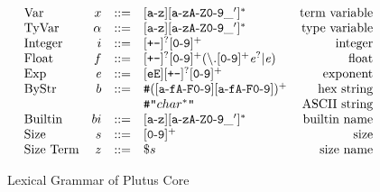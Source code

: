 \documentclass[../main.tex]{subfiles}
\begin{document}
\begin{figure*}[t]
    \centering
    \[\begin{array}{lrclr}
        \textrm{Var}     & x  & ::= & [\mathtt{a}\!\hyphen{}\!\mathtt{z}][\mathtt{a}\!\hyphen{}\!\mathtt{zA}\!\hyphen{}\!\mathtt{Z0}\!\hyphen{}\!\mathtt{9\_'}]^*                                                           & \textrm{term variable}\\
        \textrm{TyVar}   & \alpha & ::= & [\mathtt{a}\!\hyphen{}\!\mathtt{z}][\mathtt{a}\!\hyphen{}\!\mathtt{z A}\!\hyphen{}\!\mathtt{Z0}\!\hyphen{}\!\mathtt{9\_'}]^*                                                      & \textrm{type variable}\\
        \textrm{Integer} & i  & ::= & [\texttt{+-}]^?[\mathtt{0}\!\hyphen{}\!\mathtt{9}]^+                                                                                                                                  & \textrm{integer}\\
        \textrm{Float}   & f  & ::= & [\texttt{+-}]^?[\mathtt{0}\!\hyphen{}\!\mathtt{9}]^+(\mathtt{\backslash{}.}[\mathtt{0}\!\hyphen{}\!\mathtt{9}]^+\mathit{e}^?| \mathit{e})                                             & \textrm{float}\\
        \textrm{Exp}    & \mathit{e} & ::= & [\mathtt{eE}][\texttt{+-}]^?[\mathtt{0}\!\hyphen{}\!\mathtt{9}]^+                                                                                                              & \textrm{exponent}\\
        \textrm{ByStr}   & b  & ::= & \texttt{\#}([\mathtt{a}\!\hyphen{}\!\mathtt{fA}\!\hyphen{}\!\mathtt{F0}\!\hyphen{}\!\mathtt{9}][\mathtt{a}\!\hyphen{}\!\mathtt{fA}\!\hyphen{}\!\mathtt{F0}\!\hyphen{}\!\mathtt{9}])^+ & \textrm{hex string}\\
                         &    &     & \texttt{\#"}char^*\texttt{"}                                                                                                                                                          & \textrm{ASCII string}\\
        \textrm{Builtin}    & bi  & ::= & [\mathtt{a}\!\hyphen{}\!\mathtt{z}][\mathtt{a}\!\hyphen{}\!\mathtt{zA}\!\hyphen{}\!\mathtt{Z0}\!\hyphen{}\!\mathtt{9\_'}]^*                                                          & \textrm{builtin name}\\
        \textrm{Size} & s  & ::= & [\mathtt{0}\!\hyphen{}\!\mathtt{9}]^+                                                                                                                                  & \textrm{size}\\
        \textrm{Size Term} & z  & ::= & \sizename{s}                                                     & \textrm{size name}\\
                
    \end{array}\]
    \caption{Lexical Grammar of Plutus Core}
    \label{fig:Plutus_core_lexical_grammar}
\end{figure*}
\end{document}
